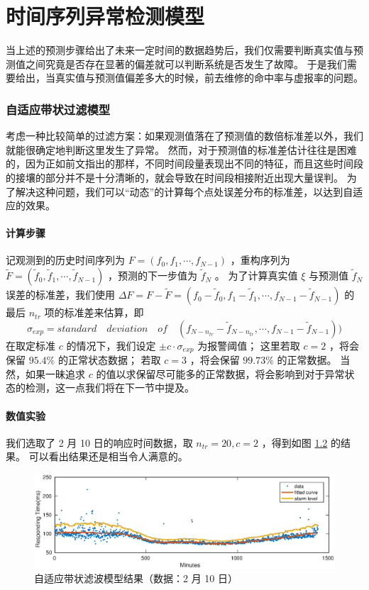 \documentclass[a4paper]{article}
\begin{document}
\part{时间序列异常检测模型}
当上述的预测步骤给出了未来一定时间的数据趋势后，我们仅需要判断真实值与预测值之间究竟是否存在显著的偏差就可以判断系统是否发生了故障。
于是我们需要给出，当真实值与预测值偏差多大的时候，前去维修的命中率与虚报率的问题。
\section{自适应带状过滤模型}
考虑一种比较简单的过滤方案：如果观测值落在了预测值的数倍标准差以外，我们就能很确定地判断这里发生了异常。
然而，对于预测值的标准差估计往往是困难的，因为正如前文指出的那样，不同时间段量表现出不同的特征，而且这些时间段的接壤的部分并不是十分清晰的，就会导致在时间段相接附近出现大量误判。
为了解决这种问题，我们可以“动态”的计算每个点处误差分布的标准差，以达到自适应的效果。
\subsection{计算步骤}
记观测到的历史时间序列为 $F=(f_0, f_1, \cdots, f_{N-1})$ ，重构序列为 $\tilde{F}=(\tilde{f}_0, \tilde{f}_1, \cdots, \tilde{f}_{N-1})$ ，预测的下一步值为 $\tilde{f}_N$ 。
为了计算真实值 $\xi$ 与预测值 $\tilde{f}_N$ 误差的标准差，我们使用 $\Delta F = F - \tilde{F} = (f_0 - \tilde{f}_0, f_1 - \tilde{f}_1, \cdots, f_{N-1} - \tilde{f}_{N-1})$ 的最后 $n_{tr}$ 项的标准差来估算，即
\begin{equation}
	\label{eqn:naive-std}
	\sigma_{exp} = standard \quad deviation \quad of \quad (f_{N-n_{tr}} - \tilde{f}_{N - n_{tr}}, \cdots, f_{N-1} - \tilde{f}_{N-1}))
\end{equation}
在取定标准 $c$ 的情况下，我们设定 $\pm c \cdot \sigma_{exp}$ 为报警阈值；
这里若取 $c = 2$ ，将会保留 $95.4\%$ 的正常状态数据；
若取 $c = 3$ ，将会保留 $99.73\%$ 的正常数据。
当然，如果一昧追求 $c$ 的值以求保留尽可能多的正常数据，将会影响到对于异常状态的检测，这一点我们将在下一节中提及。
\subsection{数值实验}
我们选取了 2 月 10 日的响应时间数据，取 $n_{tr} = 20, c = 2$ ，得到如图 \ref{} 的结果。
可以看出结果还是相当令人满意的。
\begin{figure}[htbp]
	\centering
	\includegraphics[scale=0.6]{pic/naive-detection.eps}
	\caption{自适应带状滤波模型结果（数据：2 月 10 日）}
  \label{fig:naive-detection}
\end{figure}
\end{document}
